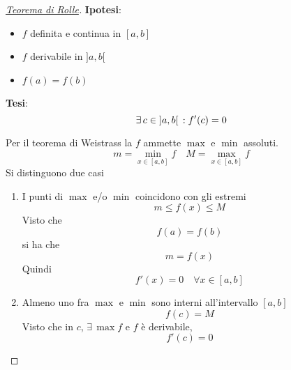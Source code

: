 \begin{proof}[\protect\hyperlink{teor:rolle}{Teorema di Rolle}]
  \textbf{Ipotesi}:
  \begin{itemize}
    \item $f$ definita e continua in $[a,b]$
    \item $f$ derivabile in $]a,b[$
    \item $f(a)=f(b)$
  \end{itemize}
  \textbf{Tesi}:
  \begin{equation*}
    \exists\,c\in{]a,b[}\,: f'(c)=0
  \end{equation*}
  \divisor

  Per il teorema di Weistrass la $f$ ammette $\max$ e $\min$ assoluti.
  \begin{equation*}
    m = \min_{x\in{[a,b]}} f \quad M = \max_{x\in{[a,b]}}f
  \end{equation*}
  Si distinguono due casi
   \begin{enumerate}
     \item I punti di $\max$ e/o $\min$ coincidono con gli estremi
       \begin{equation*}
         m\leq f(x)\leq M
       \end{equation*}
       Visto che
       \begin{equation*}
         f(a) = f(b)
       \end{equation*}
       si ha che
       \begin{equation*}
         m = f(x)
       \end{equation*}
       Quindi
       \begin{equation*}
         f'(x) = 0\quad\forall x \in{[a,b]}
       \end{equation*}
     \item Almeno uno fra $\max$ e $\min$ sono interni all'intervallo ${[a,b]}$
       \begin{equation*}
         f(c) = M
       \end{equation*}
       Visto che in $c$, $\exists\,\max f$ e $f$ è derivabile,
       \begin{equation*}
         f'(c) = 0
       \end{equation*}
   \end{enumerate}
\end{proof}


